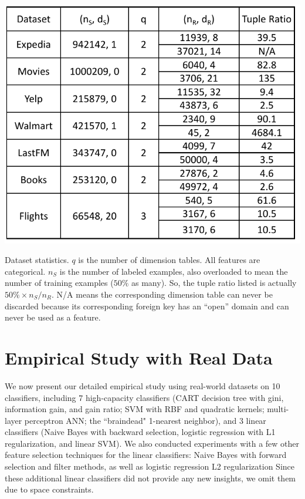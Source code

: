 \documentclass{vldb}
\begin{document}
\begin{table}[t]
\centering
\includegraphics[width=0.99\linewidth]{table1.pdf}
\caption{Dataset statistics. $q$ is the number of dimension tables. All features are categorical. $n_S$ is the number of labeled examples, also 
overloaded to mean the number of training examples ($50\%$ as many). So, the tuple ratio listed is actually $50\% \times n_S / n_R$. N/A means the 
corresponding dimension table can never be discarded because its corresponding foreign key has an ``open'' domain and can never be used as a feature.
}
\label{Table:datastats}
\end{table}


\section{Empirical Study with Real Data}

We now present our detailed empirical study using real-world datasets on 10 classifiers, including 7 high-capacity classifiers (CART decision tree with gini, 
information gain, and gain ratio; SVM with RBF and quadratic kernels; multi-layer perceptron ANN; the ``braindead" 1-nearest neighbor), and 3 linear classifiers 
(Naive Bayes with backward selection, logistic regression with L1 regularization, and linear SVM).
We also conducted experiments with a few other feature selection techniques for the linear classifiers: Naive Bayes with forward selection and filter methods, 
as well as logistic regression L2 regularization Since these additional linear classifiers did not provide any new insights, we omit them due to space constraints.
\end{document}
